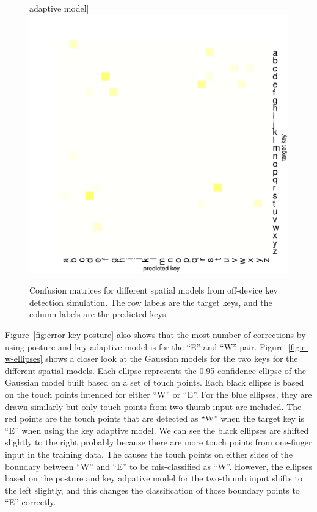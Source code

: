 \documentclass{sigchi}
\begin{document}
\begin{figure}[tb]
  adaptive model]{
    \includegraphics[width=0.49\columnwidth]{figures/sim-result-2-1.pdf}
    \label{fig:error-posture-key}
  }
  \caption{Confusion matrices for different
  spatial models from off-device key detection simulation. The row labels are the
  target keys, and the column labels are the predicted keys.}
  \label{fig:confusion-matrices}
\end{figure}

Figure~\ref{fig:error-key-posture} also shows that the most number of
corrections by using posture and key adaptive model is for the ``E'' and ``W'' pair. Figure~\ref{fig:e-w-ellipses}
shows a closer look at the Gaussian models for the two keys for the different
spatial models. Each ellipse represents the 0.95 confidence ellipse of the Gaussian model built 
based on a set of touch points.
Each black ellipse is based on the touch points intended for either ``W'' or ``E''. 
For the blue ellipses, they are drawn similarly but only touch points from two-thumb input
are included. The red points are the touch points that are detected as ``W'' when the target
key is ``E'' when using the key adaptive model. We can see the black ellipses are shifted
slightly to the right probably because there are more touch points from one-finger input in the training
data. The causes the touch points on either sides of the boundary between ``W'' and 
``E'' to be mis-classified as ``W''. However, the ellipses based on the posture and key
adpative model for the two-thumb input shifts to the left slightly, and this changes
the classification of those boundary points to ``E'' correctly.
\end{document}
